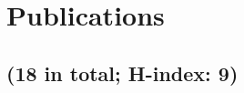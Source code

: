\documentclass[11pt,a4paper,sans]{moderncv} %
\begin{document}






\section{Publications}

\subsection{(18 in total; H-index: 9)}
\end{document}
